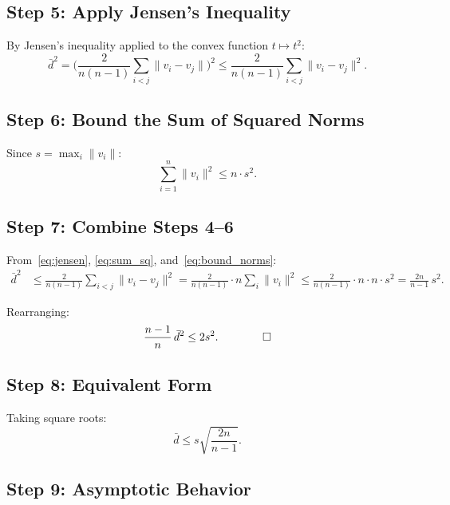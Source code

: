\documentclass[11pt,a4paper]{article}
\begin{document}
\subsection{Step 5: Apply Jensen's Inequality}

By Jensen's inequality applied to the convex function
$t \mapsto t^2$:
\begin{equation}\label{eq:jensen}
  \bar{d}^2 = \Biggl(\frac{2}{n(n-1)}
  \sum_{i<j}\|v_i - v_j\|\Biggr)^{\!2}
  \leq \frac{2}{n(n-1)}\sum_{i<j}\|v_i - v_j\|^2.
\end{equation}

\subsection{Step 6: Bound the Sum of Squared Norms}

Since $s = \max_i \|v_i\|$:
\begin{equation}\label{eq:bound_norms}
  \sum_{i=1}^n \|v_i\|^2 \leq n \cdot s^2.
\end{equation}

\subsection{Step 7: Combine Steps 4--6}

From~\eqref{eq:jensen}, \eqref{eq:sum_sq},
and~\eqref{eq:bound_norms}:
\begin{align}
  \bar{d}^2
  &\leq \frac{2}{n(n-1)} \sum_{i<j}\|v_i - v_j\|^2
  = \frac{2}{n(n-1)} \cdot n \sum_i \|v_i\|^2
  \leq \frac{2}{n(n-1)} \cdot n \cdot n \cdot s^2
  = \frac{2n}{n-1}\,s^2.
\end{align}

Rearranging:
\begin{equation}
  \frac{n-1}{n}\,\bar{d}^2 \leq 2s^2. \qquad\qed
\end{equation}

\subsection{Step 8: Equivalent Form}

Taking square roots:
\begin{equation}
  \bar{d} \leq s\sqrt{\frac{2n}{n-1}}.
\end{equation}

\subsection{Step 9: Asymptotic Behavior}
\end{document}

